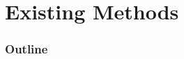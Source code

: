 \documentclass{beamer}
\newcommand{\AutoSectionTitle}{}
\begin{document}


\begin{frame}
  \frametitle{\AutoSectionTitle}
  \begin{center}
    
  \end{center}
\end{frame}




\begin{frame}
  \frametitle{\AutoSectionTitle}
  \begin{center}
    
  \end{center}
\end{frame}




\begin{frame}
  \frametitle{\AutoSectionTitle}
  \begin{center}
    
  \end{center}
\end{frame}




\begin{frame}
  \frametitle{\AutoSectionTitle}
  \begin{center}
    
  \end{center}
\end{frame}




\renewcommand{\AutoSectionTitle}{Existing Methods}

\section{\AutoSectionTitle}

\begin{frame}
  \frametitle{Outline}
  \tableofcontents[currentsection]
\end{frame}


\end{document}
